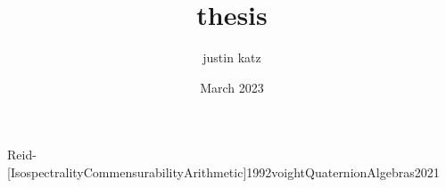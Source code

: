\documentclass{reedthesis}
\title{thesis}
\author{justin katz}
\date{March 2023}
\begin{document}
\newpage
% 
% 



%
% 
% 
% 

\newpage
\cite{weilBasicNumberTheory1974}
\cite{Leininger.McReynolds.Neumann.Reid-[LengthEigenvalueEquivalence]2007}

\cite{Borel-[CommensurabilityClassesVolumes]}
\cite{borelCohomologySpectrumArithmetic1984}
\cite{prasadFinitenessTheoremsDiscrete}{Reid-[IsospectralityCommensurabilityArithmetic]1992}{voightQuaternionAlgebras2021}
{}


\end{document}
